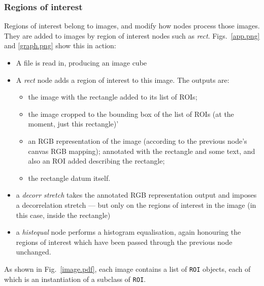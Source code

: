 \subsubsection{Regions of interest}
Regions of interest belong to images, and modify how nodes process those
images. They are added to images by region of interest nodes such as
\emph{rect}. Figs.~\ref{app.png} and \ref{graph.png} show this in action:
\begin{itemize}
\item A file is read in, producing an image cube
\item A \emph{rect} node adds a region of interest to this image. The outputs are:
\begin{itemize}
\item the image with the rectangle added to its list of ROIs;
\item the image cropped to the bounding box of the list of ROIs (at the moment, just this rectangle)'
\item an RGB representation of the image (according to the previous node's canvas RGB mapping);
annotated with the rectangle and some text, and also an ROI added describing the rectangle;
\item the rectangle datum itself.
\end{itemize}
\item a \emph{decorr stretch} takes the annotated RGB representation output and imposes a decorrelation
stretch --- but only on the regions of interest in the image (in this case, inside the rectangle)
\item a \emph{histequal} node performs a histogram equalisation, again honouring the regions of interest
which have been passed through the previous node unchanged.
\end{itemize}
As shown in Fig.~\ref{image.pdf}, each image contains a list of \texttt{ROI} objects,
each of which is an instantiation of a subclass of \texttt{ROI}. 


